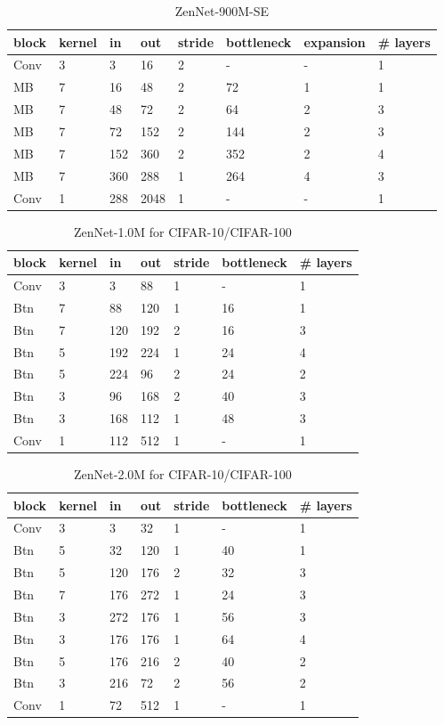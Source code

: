 \documentclass{article}
\providecommand{\tabularnewline}{\\}
\providecommand{\tabularnewline}{\\}
\begin{document}
\begin{table}[!h]
 \begin{center}
   \begin{tabular}{llllllll}
     \toprule 
     block & kernel & in & out & stride & bottleneck & expansion & \# layers\tabularnewline
     \midrule
     \midrule
Conv & 3 & 3 & 16 & 2 & - & - & 1 \tabularnewline
\midrule
MB & 7 & 16 & 48 & 2 & 72 & 1 & 1 \tabularnewline
\midrule
MB & 7 & 48 & 72 & 2 & 64 & 2 & 3 \tabularnewline
\midrule
MB & 7 & 72 & 152 & 2 & 144 & 2 & 3 \tabularnewline
\midrule
MB & 7 & 152 & 360 & 2 & 352 & 2 & 4 \tabularnewline
\midrule
MB & 7 & 360 & 288 & 1 & 264 & 4 & 3 \tabularnewline
\midrule
Conv & 1 & 288 & 2048 & 1 & - & - & 1 \tabularnewline
     \bottomrule
     \end{tabular}        
 \end{center}
 \caption{ZenNet-900M-SE}
 \label{tab:struct-ZenNet-900M-SE}
\end{table}

\begin{table}[!h]
 \begin{center}
   \begin{tabular}{lllllll}
     \toprule 
     block & kernel & in & out & stride & bottleneck & \# layers\tabularnewline
     \midrule
     \midrule 
     Conv & 3 & 3 & 88 & 1 & - & 1\tabularnewline
     \midrule 
     Btn & 7 & 88 & 120 & 1 & 16 & 1\tabularnewline
     \midrule 
     Btn & 7 & 120 & 192 & 2 & 16 & 3\tabularnewline
     \midrule 
     Btn & 5 & 192 & 224 & 1 & 24 & 4\tabularnewline
     \midrule 
     Btn & 5 & 224 & 96 & 2 & 24 & 2\tabularnewline
     \midrule 
     Btn & 3 & 96 & 168 & 2 & 40 & 3\tabularnewline
     \midrule 
     Btn & 3 & 168 & 112 & 1 & 48 & 3\tabularnewline
     \midrule 
     Conv & 1 & 112 & 512 & 1 & - & 1\tabularnewline
     \bottomrule
     \end{tabular}
 \end{center}
 \caption{ZenNet-1.0M for CIFAR-10/CIFAR-100}
 \label{tab:struct-ZenNet-1M}
\end{table}

\begin{table}[!h]
 \begin{center}
   \begin{tabular}{lllllll}
     \toprule 
     block & kernel & in & out & stride & bottleneck & \# layers\tabularnewline
     \midrule
     \midrule 
     Conv & 3 & 3 & 32 & 1 & - & 1\tabularnewline
     \midrule 
     Btn & 5 & 32 & 120 & 1 & 40 & 1\tabularnewline
     \midrule 
     Btn & 5 & 120 & 176 & 2 & 32 & 3\tabularnewline
     \midrule 
     Btn & 7 & 176 & 272 & 1 & 24 & 3\tabularnewline
     \midrule 
     Btn & 3 & 272 & 176 & 1 & 56 & 3\tabularnewline
     \midrule 
     Btn & 3 & 176 & 176 & 1 & 64 & 4\tabularnewline
     \midrule 
     Btn & 5 & 176 & 216 & 2 & 40 & 2\tabularnewline
     \midrule 
     Btn & 3 & 216 & 72 & 2 & 56 & 2\tabularnewline
     \midrule 
     Conv & 1 & 72 & 512 & 1 & - & 1\tabularnewline
     \bottomrule
     \end{tabular}        
 \end{center}
 \caption{ZenNet-2.0M for CIFAR-10/CIFAR-100}
 \label{tab:struct-ZenNet-2M}
\end{table}
\end{document}
